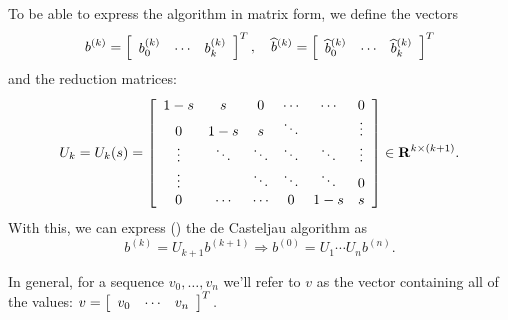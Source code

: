 To be able to express the algorithm in matrix form, we define
the vectors
\begin{equation}
b^{(k)} = \left[\begin{array}{c c c} b_0^{(k)} & \cdots &
b_k^{(k)}\end{array}\right]^T, \quad
\widehat{b}^{(k)} = \left[\begin{array}{c c c} \widehat{b}_0^{(k)} & \cdots &
    \widehat{b}_k^{(k)}\end{array}\right]^T
\end{equation}
and the reduction matrices:
\begin{equation}
U_k = U_k(s) = \left[\begin{array}{c c c c c c}
    1 - s  & s      & 0      & \cdots & \cdots & 0      \\
    0      & 1 - s  & s      & \ddots &        & \vdots \\
    \vdots & \ddots & \ddots & \ddots & \ddots & \vdots \\
    \vdots &        & \ddots & \ddots & \ddots & 0 \\
    0      & \cdots & \cdots & 0      & 1 - s  & s
\end{array}\right] \in \mathbf{R}^{k \times (k + 1)}.
\end{equation}
With this, we can express (\cite{Mainar1999}) the de Casteljau algorithm as
\begin{equation}\label{matrix-de-casteljau}
b^{(k)} = U_{k + 1} b^{(k + 1)}
\Longrightarrow b^{(0)} = U_1 \cdots U_n b^{(n)}.
\end{equation}

In general, for a sequence \(v_0, \ldots, v_n\) we'll refer to \(v\)
as the vector containing all of the values:
\(v = \left[\begin{array}{c c c} v_0 & \cdots &
    v_n\end{array}\right]^T.\)
